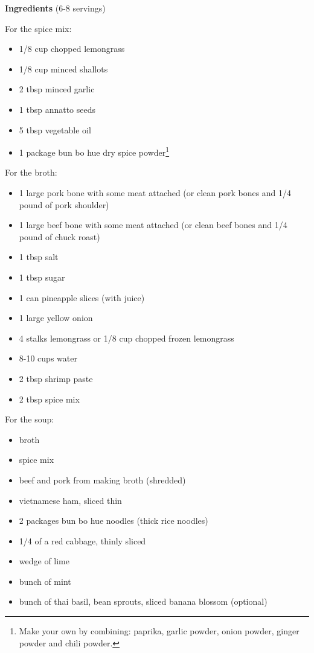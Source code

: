 \documentclass[
]{book}
\providecommand{\tightlist}{%
  \setlength{\itemsep}{0pt}\setlength{\parskip}{0pt}}
\begin{document}
\begin{blackbox}

\textbf{Ingredients} (6-8 servings)

For the spice mix:

\begin{itemize}
\tightlist
\item
  1/8 cup chopped lemongrass
\item
  1/8 cup minced shallots
\item
  2 tbsp minced garlic
\item
  1 tbsp annatto seeds
\item
  5 tbsp vegetable oil
\item
  1 package bun bo hue dry spice powder\footnote{Make your own by combining: paprika, garlic powder, onion powder, ginger powder and chili powder.}
\end{itemize}

For the broth:

\begin{itemize}
\tightlist
\item
  1 large pork bone with some meat attached (or clean pork bones and 1/4 pound of pork shoulder)
\item
  1 large beef bone with some meat attached (or clean beef bones and 1/4 pound of chuck roast)
\item
  1 tbsp salt
\item
  1 tbsp sugar
\item
  1 can pineapple slices (with juice)
\item
  1 large yellow onion
\item
  4 stalks lemongrass or 1/8 cup chopped frozen lemongrass
\item
  8-10 cups water
\item
  2 tbsp shrimp paste
\item
  2 tbsp spice mix
\end{itemize}

For the soup:

\begin{itemize}
\tightlist
\item
  broth
\item
  spice mix
\item
  beef and pork from making broth (shredded)
\item
  vietnamese ham, sliced thin
\item
  2 packages bun bo hue noodles (thick rice noodles)
\item
  1/4 of a red cabbage, thinly sliced
\item
  wedge of lime
\item
  bunch of mint
\item
  bunch of thai basil, bean sprouts, sliced banana blossom (optional)
\end{itemize}

\end{blackbox}
\end{document}
